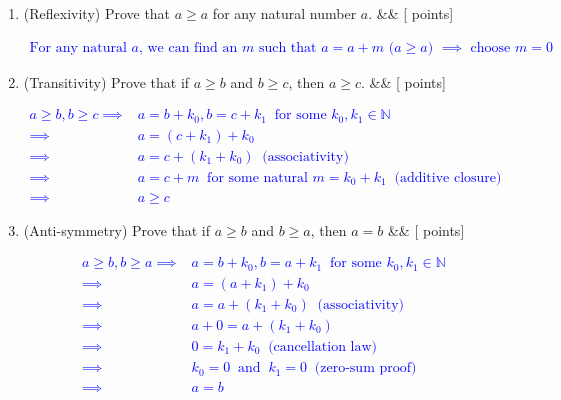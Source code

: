 \documentclass[12pt]{article}
\newcommand{\points}[1]{\hfill {[#1 points]}}
\newcommand{\problem}[2][]{%
  \item {#2}%
  \ifx&#1&%
  \else%
    \points{#1}%
  \fi
  \par\vspace{0.5em}
}
\begin{document}
\begin{enumerate}[leftmargin=*, label=\textbf{\arabic*.}]
\begin{enumerate}
	   \problem{(Reflexivity) Prove that $a \geq a$ for any natural number $a$.}
    	\textcolor{blue}{
	\begin{align*}
	\text{For any natural $a$, we can find an $m$ such that $a = a + m$ ($a \geq a$) $\implies$ choose $m = 0$}
	\end{align*}}
	
	   \problem{(Transitivity) Prove that if $a \geq b$ and $b \geq c$, then $a \geq c$.}
    	\textcolor{blue}{
	\begin{align*}
	a \geq b, b \geq c \implies& a = b + k_0, b = c + k_1 \;\; \text{for some $k_0,k_1 \in \mathbb{N}$}\\
	\implies& a = (c + k_1) + k_0\\
	\implies& a = c + (k_1 + k_0) \;\; \text{(associativity)}\\
	\implies& a = c + m \;\; \text{for some natural $m = k_0 + k_1$} \;\; \text{(additive closure)}\\
	\implies& a \geq c
	\end{align*}}
	
	\problem{(Anti-symmetry) Prove that if $a \geq b$ and $b \geq a$, then $a = b$}
	\textcolor{blue}{
	\begin{align*}
	a \geq b, b \geq a \implies& a = b + k_0, b = a + k_1 \;\; \text{for some $k_0,k_1 \in \mathbb{N}$}\\
	\implies& a = (a + k_1) + k_0\\
	\implies& a = a + (k_1 + k_0) \;\; \text{(associativity)}\\
	\implies& a + 0 = a + (k_1 + k_0)\\
	\implies& 0 = k_1 + k_0 \;\; \text{(cancellation law)}\\
	\implies& k_0 = 0 \;\; \text{and} \;\; k_1 = 0 \;\; \text{(zero-sum proof)}\\
	\implies& a = b\\
 	\end{align*}}
	

\end{enumerate}
\end{enumerate}
\end{document}
